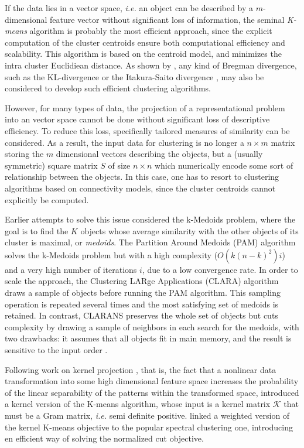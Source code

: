 \documentclass[a4paper,twoside]{article}
\begin{document}
If the data lies in a vector space, \textit{i.e.} an object can be described by a $m$-dimensional feature vector without significant loss of information, the seminal \emph{K-means} algorithm \cite{macQueenBsmsp67} is probably the most efficient approach, since the explicit computation of the cluster centroids ensure both computational efficiency and scalability. This algorithm is  based on the centroid model, and minimizes the intra cluster Euclidiean distance. As shown by \cite{Banerjee:2005:CBD:1046920.1194902}, any kind of Bregman divergence, such as the KL-divergence \cite{Dhillon:2003:DIT:944919.944973} or the Itakura-Saito divergence \cite{linde:algorithm}, may also be considered to develop such efficient clustering algorithms.

However, for many types of data, the projection of a representational problem into an vector space cannot be done without significant loss of descriptive efficiency. To reduce this loss, specifically tailored measures of similarity can be considered. As a result, the input data for clustering is no longer a $n \times m$ matrix storing the $m$ dimensional vectors describing the objects, but a (usually symmetric) square matrix $S$ of size $n \times n$ which numerically encode some sort of relationship between the objects. In this case, one has to resort to clustering algorithms based on connectivity models, since the cluster centroids cannot explicitly be computed.

Earlier attempts to solve this issue considered the k-Medoids problem, where the goal is to find the $K$ objects whose average similarity with the other objects of its cluster is maximal, or \emph{medoids}. The Partition Around Medoids (PAM) \cite{KaufmanRousseeuw90} algorithm solves the k-Medoids problem but with a high complexity ($O(k(n-k)^2)i$) and a very high number of iterations $i$, due to a low convergence rate. In order to scale the approach, the Clustering LARge Applications (CLARA) algorithm \cite{KaufmanRousseeuw90} draws a sample of objects before running the PAM algorithm. This sampling operation is repeated several times and the most satisfying set of medoids is retained. In contrast, CLARANS \cite{Ng:1994:EEC:645920.672827} preserves the whole set of objects but cuts complexity by  drawing a sample of neighbors in each search for the medoids, with two drawbacks: it assumes that all objects fit in main memory, and the result is sensitive to the input order \cite{Zhang:1996:BED:233269.233324}.


Following work on kernel projection \cite{Vapnik:1995:NSL:211359}, that is, the fact that a nonlinear data transformation into some high dimensional feature space increases the probability of the linear separability of the patterns within the transformed space, \cite{Girolami:2002:MKC:2325785.2326903} introduced a kernel version of the K-means algorithm, whose input is a kernel matrix $\mathcal{K}$ that must be a Gram matrix, \textit{i.e.} semi definite positive. \cite{Dhillon:2007:WGC:1313055.1313291} linked a weighted version of the kernel K-means objective to the popular spectral clustering one, introducing en efficient way of solving the normalized cut objective.
\end{document}
